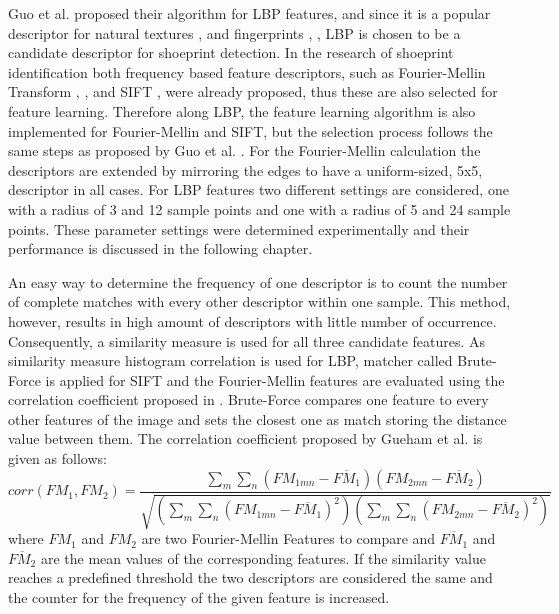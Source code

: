 \documentclass[draft,final]{vutinfth} %
\begin{document}
\par
Guo et al. \cite{guo2012discriminative} proposed their algorithm for LBP features, and since it is a popular descriptor for natural textures \cite{hong2014combining}, \cite{ahonen2009rotation} and fingerprints \cite{wang2013pixel}, \cite{rida2018palmprint}, LBP is chosen to be a candidate descriptor for shoeprint detection.
In the research of shoeprint identification both frequency based feature descriptors, such as Fourier-Mellin Transform \cite{wu2019crime}, \cite{gueham2008automatic}, and SIFT \cite{nibouche2009rotation}, \cite{richetelli2017classification} were already proposed, thus these are also selected for feature learning.
Therefore along LBP, the feature learning algorithm is also implemented for Fourier-Mellin and SIFT, but the selection process follows the same steps as proposed by Guo et al. \cite{guo2012discriminative}.
For the Fourier-Mellin calculation the descriptors are extended by mirroring the edges to have a uniform-sized, 5x5, descriptor in all cases.
For LBP features two different settings are considered, one with a radius of 3 and 12 sample points and one with a radius of 5 and 24 sample points.
These parameter settings were determined experimentally and their performance is discussed in the following chapter.
\par
An easy way to determine the frequency  of one descriptor is to count the number of complete matches with every other descriptor within one sample.
This method, however, results in high amount of descriptors with little number of occurrence.
Consequently, a similarity measure is used for all three candidate features. 
As similarity measure histogram correlation is used for LBP, matcher called Brute-Force is applied for SIFT and the Fourier-Mellin features are evaluated using the correlation coefficient proposed  in \cite{gueham2008automatic}.
Brute-Force compares one feature to every other features of the image and sets the closest one as match storing the distance value between them.
The correlation coefficient proposed by Gueham et al. \cite{gueham2008automatic} is given as follows:
\[ corr(FM_{1},FM_{2}) = \frac{\sum\limits_{m}\sum\limits_{n}(FM_{1mn}-\overline{FM_{1}})(FM_{2mn}-\overline{FM_{2}})}{\sqrt{(\sum\limits_{m}\sum\limits_{n}(FM_{1mn}-\overline{FM_{1}})^2)(\sum\limits_{m}\sum\limits_{n}(FM_{2mn}-\overline{FM_{2}})^2)}}  \]
\label{FMcorr}
where $FM_{1}$ and $FM_{2}$ are two Fourier-Mellin Features to compare and $\overline{FM_{1}}$ and $\overline{FM_{2}}$ are the mean values of the corresponding features.
If the similarity value reaches a predefined threshold the two descriptors are considered the same and the counter for the frequency of the given feature is increased.
\end{document}
